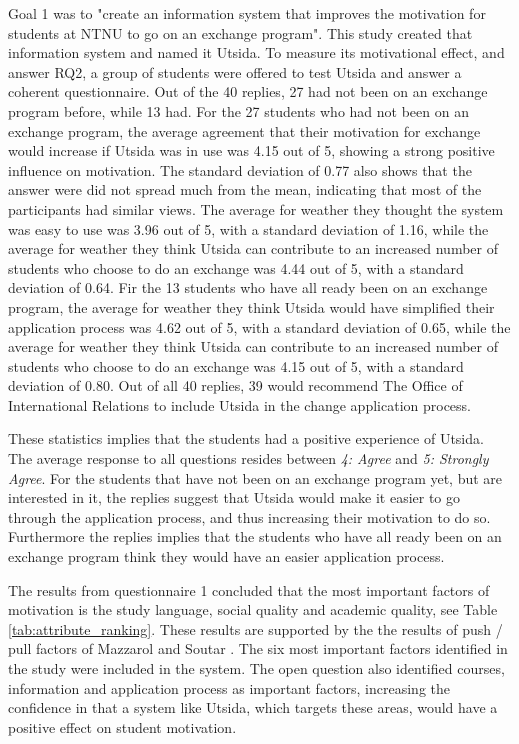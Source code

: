 Goal 1 was to "create an information system that improves the motivation for students at NTNU to go on an exchange program". This study created that information system and named it Utsida. To measure its motivational effect, and answer RQ2, a group of students were offered to test Utsida and answer a coherent questionnaire. Out of the 40 replies, 27 had not been on an exchange program before, while 13 had. For the 27 students who had not been on an exchange program, the average agreement that their motivation for exchange would increase if Utsida was in use was 4.15 out of 5, showing a strong positive influence on motivation. The standard deviation of 0.77 also shows that the answer were did not spread much from the mean, indicating that most of the participants had similar views. The average for weather they thought the system was easy to use was 3.96 out of 5, with a standard deviation of 1.16, while the average for weather they think Utsida can contribute to an increased number of students who choose to do an exchange was 4.44 out of 5, with a standard deviation of 0.64. Fir the 13 students who have all ready been on an exchange program, the average for weather they think Utsida would have simplified their application process was 4.62 out of 5, with a standard deviation of 0.65, while the average for weather they think Utsida can contribute to an increased number of students who choose to do an exchange was 4.15 out of 5, with a standard deviation of 0.80. Out of all 40 replies, 39 would recommend The Office of International Relations to include Utsida in the change application process. 

These statistics implies that the students had a positive experience of Utsida. The average response to all questions resides between \textit{4: Agree} and \textit{5: Strongly Agree}. For the students that have not been on an exchange program yet, but are interested in it, the replies suggest that Utsida would make it easier to go through the application process, and thus increasing their motivation to do so. Furthermore the replies implies that the students who have all ready been on an exchange program think they would have an easier application process. 


The results from questionnaire 1 concluded that the most important factors of motivation is the study language, social quality and academic quality, see Table \ref{tab:attribute_ranking}. These results are supported by the the results of push / pull factors of Mazzarol and Soutar \cite{mazzarol2002push}. The six most important factors identified in the study were included in the system. The open question also identified courses, information and application process as important factors, increasing the confidence in that a system like Utsida, which targets these areas, would have a positive effect on student motivation.

